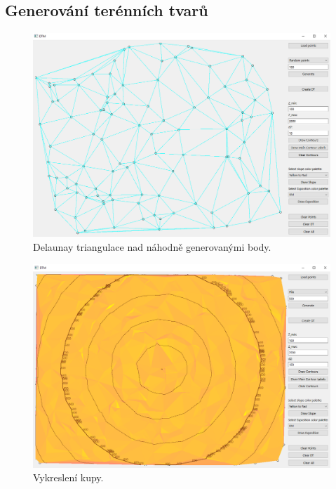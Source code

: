 \documentclass[a4paper, 12pt, oneside, titlepage]{article} %
\begin{document}
\subsection{Generování terénních tvarů}
\begin{figure}[!htb]
	\centering
	\includegraphics[scale=0.45]{obrazky/rand_dt.png} 
	\caption{Delaunay triangulace nad náhodně generovanými body.
	}
	\label{fig:rand_dt}
\end{figure} 
\FloatBarrier

\begin{figure}[!htb]
	\centering
	\includegraphics[scale=0.45]{obrazky/kupa.png} 
	\caption{Vykreslení kupy.
	}
	\label{fig:kupa}
\end{figure} 
\FloatBarrier
\end{document}
